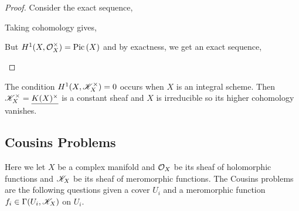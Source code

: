 \documentclass[12pt]{article}
\begin{document}
\begin{proof}
Consider the exact sequence,
\begin{center}
\end{center}
Taking cohomology gives,
\begin{center}
\end{center}
But $H^1(X, \mathcal{O}_{X}^\times) = \mathrm{Pic} \left( X \right)$ and by exactness, we get an exact sequence,
\begin{center}
\end{center}
\end{proof}

\begin{rmk}
The condition $H^1(X, \mathscr{K}_X^\times) = 0$ occurs when $X$ is an integral scheme. Then $\mathscr{K}_X^\times = \underline{K(X)^\times}$ is a constant sheaf and $X$ is irreducible so its higher cohomology vanishes. 
\end{rmk}


\subsection{Cousins Problems} 

Here we let $X$ be a complex manifold and $\mathcal{O}_{X}$ be its sheaf of holomorphic functions and $\mathscr{K}_X$ be its sheaf of meromorphic functions. The Cousins problems are the following questions given a cover $U_i$ and a meromorphic function $f_i \in \Gamma(U_i, \mathscr{K}_X)$ on $U_i$. 
\end{document}
